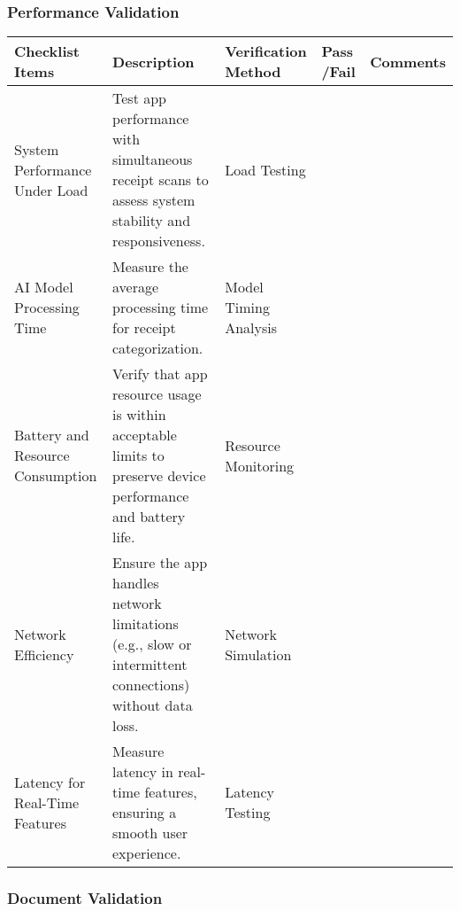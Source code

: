 \documentclass[12pt, titlepage]{article}
\begin{document}
\newpage

\subsubsection{Performance Validation}

\noindent \begin{tabular}{|>{\raggedright\arraybackslash}p{3cm}|>{\raggedright\arraybackslash}p{4cm}|>{\raggedright\arraybackslash}p{3cm}|p{1cm}|p{2.25cm}|}
	\hline
	\textbf{Checklist Items} & \textbf{Description} & \textbf{Verification Method} & \textbf{Pass /Fail} & \textbf{Comments} \\ 
	\hline
	System Performance Under Load & Test app performance with simultaneous receipt scans to assess system stability and responsiveness.	& Load Testing & & \\
	\hline
	AI Model Processing Time & Measure the average processing time for receipt categorization. & Model Timing Analysis & & \\
	\hline
	Battery and Resource Consumption & Verify that app resource usage is within acceptable limits to preserve device performance and battery life. & Resource Monitoring & & \\
	\hline
	Network Efficiency & Ensure the app handles network limitations (e.g., slow or intermittent connections) without data loss.	& Network Simulation & & \\
	\hline
	Latency for Real-Time Features & Measure latency in real-time features, ensuring a smooth user experience. & Latency Testing & & \\
	\hline
\end{tabular}

\newpage

\subsubsection{Document Validation}
\end{document}
